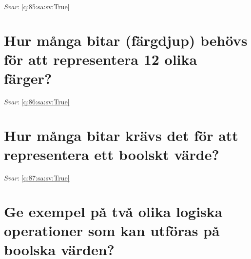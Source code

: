 \documentclass[a4paper,11pt,oneside]{book}
\begin{document}
\begin{sloppypar}
\label{q:85:sa:sv:False}

\vspace{2cm}

\noindent\makebox[\textwidth]{\hrulefill}

\vspace{1cm}

\textit{Svar}: \autoref{q:85:sa:sv:True}



\section{Hur m\r{a}nga bitar (f\"argdjup) beh\"ovs f\"or att representera 12 olika f\"arger?}

\label{q:86:sa:sv:False}

\vspace{2cm}

\noindent\makebox[\textwidth]{\hrulefill}

\vspace{1cm}

\textit{Svar}: \autoref{q:86:sa:sv:True}



\section{Hur m\r{a}nga bitar kr\"avs det f\"or att representera ett boolskt v\"arde?}

\label{q:87:sa:sv:False}

\vspace{2cm}

\noindent\makebox[\textwidth]{\hrulefill}

\vspace{1cm}

\textit{Svar}: \autoref{q:87:sa:sv:True}



\section{Ge exempel p\r{a} tv\r{a} olika logiska operationer som kan utf\"oras p\r{a} boolska v\"arden?}

\label{q:88:sa:sv:False}

\vspace{2cm}

\noindent\makebox[\textwidth]{\hrulefill}

\vspace{1cm}


\end{sloppypar}
\end{document}
